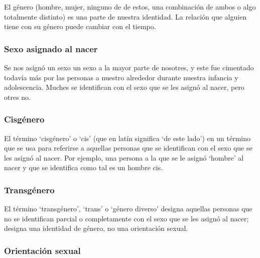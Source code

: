 \documentclass[12pt,openany]{book}
\begin{document}
El género (hombre, mujer, ninguno de de estos, una combinación de ambos o algo totalmente distinto) es una parte de nuestra identidad. La relación que alguien tiene con su género puede cambiar con el tiempo.

\subsubsection*{Sexo asignado al nacer}

Se nos asignó un sexo un sexo a la mayor parte de nosotres, y este fue cimentado todavía más por las personas a nuestro alrededor durante nuestra infancia y adolescencia. Muches se identifican con el sexo que se les asignó al nacer, pero otres no. 

\subsubsection*{Cisgénero}

El término `cisgénero' o `cis' (que en latín significa ‘de este lado’) en un término que se usa para referirse a aquellas personas que se identifican con el sexo que se les asignó al nacer. Por ejemplo, una persona a la que se le asignó `hombre' al nacer y que se identifica como tal es un hombre cis.

\begin{figure}[h]
    \centering
\end{figure}

\subsubsection*{Transgénero}

El término `transgénero',  `trans' o `género diverso' designa aquellas personas que no se identifican parcial o completamente con el sexo que se les asignó al nacer; designa una identidad de género, no una orientación sexual.

\subsubsection*{Orientación sexual}
\end{document}
